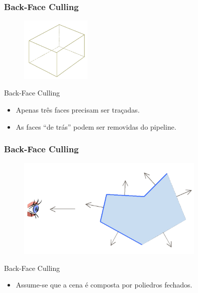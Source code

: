 \documentclass{beamer}
\begin{document}
\begin{frame}
\frametitle{Back-Face Culling}

		\begin{figure}[!h]
			\begin{center}
				\includegraphics[width=0.3\textwidth]{Figures/Cub}
			\end{center}
		\end{figure}
		
		\begin{block}{Back-Face Culling}
			\begin{itemize}
				\item Apenas três faces precisam ser traçadas.
			\end{itemize}
		\end{block}
		
		\begin{block}{}
			\begin{itemize}	
				\item As faces ``de trás'' podem ser removidas do pipeline. 
			\end{itemize}
		\end{block}
		
\end{frame}

\begin{frame}
\frametitle{Back-Face Culling}

		\begin{figure}[!h]
			\begin{center}
				\includegraphics[width=0.8\textwidth]{Figures/FroFac}
			\end{center}
		\end{figure}
		
		\begin{block}{Back-Face Culling}
			\begin{itemize}	
				\item Assume-se que a cena é composta por poliedros fechados.
			\end{itemize}
		\end{block}
		
\end{frame}
\end{document}
